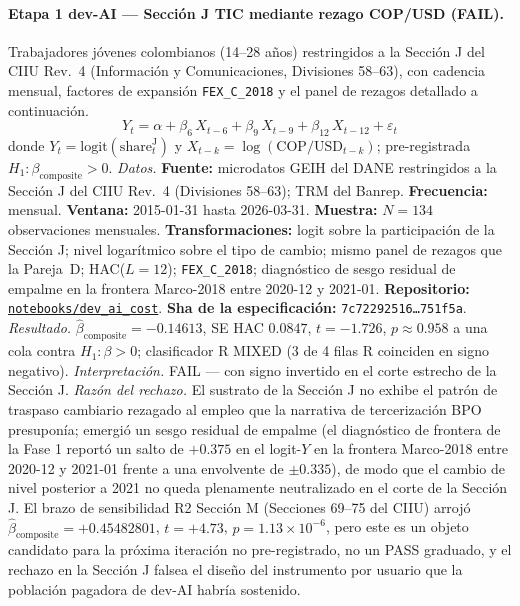 \documentclass[11pt,a4paper]{article}
\theoremstyle{plain}
\begin{document}
\paragraph{Etapa 1 dev-AI --- Sección J TIC mediante rezago COP/USD (FAIL).}
Trabajadores jóvenes colombianos (14--28 años) restringidos a la Sección J del CIIU Rev.~4 (Información y Comunicaciones, Divisiones 58--63), con cadencia mensual, factores de expansión \texttt{FEX\_C\_2018} y el panel de rezagos detallado a continuación.
\[ Y_t = \alpha + \beta_6\, X_{t-6} + \beta_9\, X_{t-9} + \beta_{12}\, X_{t-12} + \varepsilon_t \]
donde \(Y_t = \mathrm{logit}(\mathrm{share}_t^{\mathrm{J}})\) y \(X_{t-k} = \log(\mathrm{COP}/\mathrm{USD}_{t-k})\); pre-registrada \(H_1: \beta_{\mathrm{composite}} > 0\).
\textit{Datos.} \textbf{Fuente:} microdatos GEIH del DANE restringidos a la Sección J del CIIU Rev.~4 (Divisiones 58--63); TRM del Banrep. \textbf{Frecuencia:} mensual. \textbf{Ventana:} 2015-01-31 hasta 2026-03-31. \textbf{Muestra:} \(N = 134\) observaciones mensuales. \textbf{Transformaciones:} logit sobre la participación de la Sección J; nivel logarítmico sobre el tipo de cambio; mismo panel de rezagos que la Pareja~D; HAC(\(L=12\)); \texttt{FEX\_C\_2018}; diagnóstico de sesgo residual de empalme en la frontera Marco-2018 entre 2020-12 y 2021-01. \textbf{Repositorio:} \href{https://github.com/JMSBPP/abrigo-analytics/tree/master/notebooks/dev_ai_cost}{\texttt{notebooks/dev\_ai\_cost}}. \textbf{Sha de la especificación:} \texttt{7c72292516\ldots 751f5a}.
\textit{Resultado.} \(\hat{\beta}_{\mathrm{composite}} = -0.14613\), SE HAC \(0.0847\), \(t = -1.726\), \(p \approx 0.958\) a una cola contra \(H_1: \beta > 0\); clasificador R MIXED (3 de 4 filas R coinciden en signo negativo).
\textit{Interpretación.} FAIL --- con signo invertido en el corte estrecho de la Sección J.
\textit{Razón del rechazo.} El sustrato de la Sección J no exhibe el patrón de traspaso cambiario rezagado al empleo que la narrativa de tercerización BPO presuponía; emergió un sesgo residual de empalme (el diagnóstico de frontera de la Fase 1 reportó un salto de \(+0.375\) en el logit-\(Y\) en la frontera Marco-2018 entre 2020-12 y 2021-01 frente a una envolvente de \(\pm 0.335\)), de modo que el cambio de nivel posterior a 2021 no queda plenamente neutralizado en el corte de la Sección J. El brazo de sensibilidad R2 Sección M (Secciones 69--75 del CIIU) arrojó \(\hat{\beta}_{\mathrm{composite}} = +0.45482801\), \(t = +4.73\), \(p = 1.13 \times 10^{-6}\), pero este es un objeto candidato para la próxima iteración no pre-registrado, no un PASS graduado, y el rechazo en la Sección J falsea el diseño del instrumento por usuario que la población pagadora de dev-AI habría sostenido.
\end{document}

